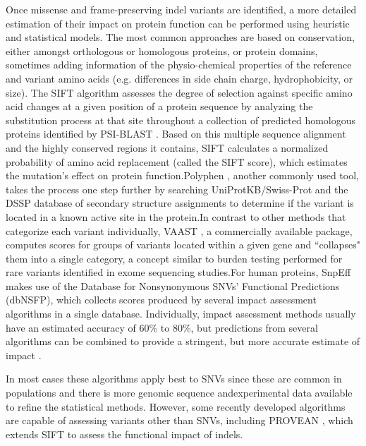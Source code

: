 Once missense and frame-preserving indel variants are identified, a more detailed estimation of their impact on protein function can be performed using heuristic and statistical models. The most common approaches are based on conservation, either amongst orthologous or homologous proteins, or protein domains, sometimes adding information of the physio-chemical properties of the reference and variant amino acids (e.g. differences in side chain charge, hydrophobicity, or size). The SIFT algorithm \cite{kumar2009predicting} assesses the degree of selection against specific amino acid changes at a given position of a protein sequence by analyzing the substitution process at that site throughout a collection of predicted homologous proteins identified by PSI-BLAST \cite{altschul1997gapped}. Based on this multiple sequence alignment and the highly conserved regions it contains, SIFT calculates a normalized probability of amino acid replacement (called the SIFT score), which estimates the mutation’s effect on protein function.Polyphen \cite{adzhubei2010method}, another commonly used tool, takes the process one step further by searching UniProtKB/Swiss-Prot \cite{uniprot2013update} and the DSSP database of secondary structure assignments \cite{joosten2011series} to determine if the variant is located in a known active site in the protein.In contrast to other methods that categorize each variant individually, VAAST \cite{rope2011using}, a commercially available package, computes scores for groups of variants located within a given gene and ``collapses" them into a single category, a concept similar to burden testing performed for rare variants identified in exome sequencing studies.For human proteins, SnpEff makes use of the Database for Nonsynonymous SNVs’ Functional Predictions \cite{liu2011dbnsfp} (dbNSFP), which collects scores produced by several impact assessment algorithms in a single database. Individually, impact assessment methods usually have an estimated accuracy of 60\% to 80\%, but predictions from several algorithms can be combined to provide a stringent, but more accurate estimate of impact \cite{choi2012predicting}.

In most cases these algorithms apply best to SNVs since these are common in populations and there is more genomic sequence andexperimental data available to refine the statistical methods. However, some recently developed algorithms are capable of assessing variants other than SNVs, including PROVEAN \cite{choi2012predicting}, which extends SIFT to assess the functional impact of indels.

